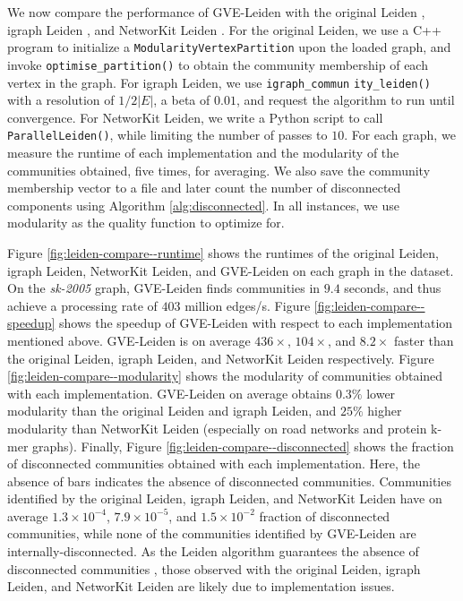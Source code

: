We now compare the performance of GVE-Leiden with the original Leiden \cite{com-traag19}, igraph Leiden \cite{csardi2006igraph}, and NetworKit Leiden \cite{staudt2016networkit}. For the original Leiden, we use a C++ program to initialize a \texttt{ModularityVertexPartition} upon the loaded graph, and invoke \texttt{optimise\_partition()} to obtain the community membership of each vertex in the graph. For igraph Leiden, we use \texttt{igraph\_commun} \texttt{ity\_leiden()} with a resolution of $1/2|E|$, a beta of $0.01$, and request the algorithm to run until convergence. For NetworKit Leiden, we write a Python script to call \texttt{ParallelLeiden()}, while limiting the number of passes to $10$. For each graph, we measure the runtime of each implementation and the modularity of the communities obtained, five times, for averaging. We also save the community membership vector to a file and later count the number of disconnected components using Algorithm \ref{alg:disconnected}. In all instances, we use modularity as the quality function to optimize for.

Figure \ref{fig:leiden-compare--runtime} shows the runtimes of the original Leiden, igraph Leiden, NetworKit Leiden, and GVE-Leiden on each graph in the dataset. On the \textit{sk-2005} graph, GVE-Leiden finds communities in $9.4$ seconds, and thus achieve a processing rate of $403$ million edges/s. Figure \ref{fig:leiden-compare--speedup} shows the speedup of GVE-Leiden with respect to each implementation mentioned above. GVE-Leiden is on average $436\times$, $104\times$, and $8.2\times$ faster than the original Leiden, igraph Leiden, and NetworKit Leiden respectively. Figure \ref{fig:leiden-compare--modularity} shows the modularity of communities obtained with each implementation. GVE-Leiden on average obtains $0.3\%$ lower modularity than the original Leiden and igraph Leiden, and $25\%$ higher modularity than NetworKit Leiden (especially on road networks and protein k-mer graphs). Finally, Figure \ref{fig:leiden-compare--disconnected} shows the fraction of disconnected communities obtained with each implementation. Here, the absence of bars indicates the absence of disconnected communities. Communities identified by the original Leiden, igraph Leiden, and NetworKit Leiden have on average $1.3\times10^{-4}$, $7.9\times10^{-5}$, and $1.5\times10^{-2}$ fraction of disconnected communities, while none of the communities identified by GVE-Leiden are internally-disconnected. As the Leiden algorithm guarantees the absence of disconnected communities \cite{com-traag19}, those observed with the original Leiden, igraph Leiden, and NetworKit Leiden are likely due to implementation issues.

